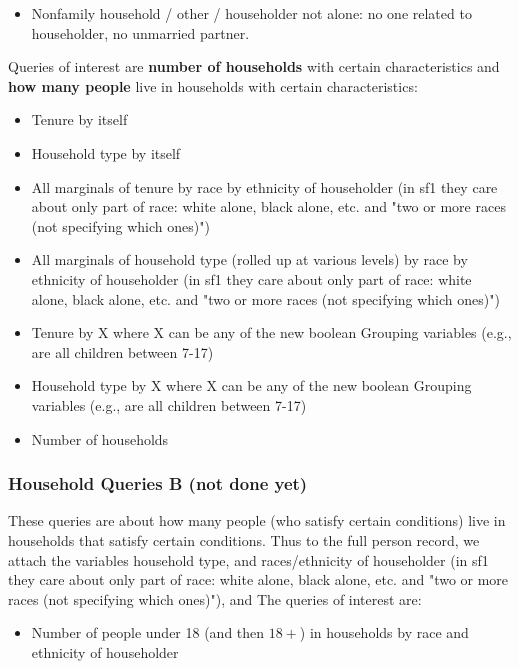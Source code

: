 \documentclass{amsart}
\begin{document}
{\begin{itemize}
\item Nonfamily household / other / householder not alone: no one related to householder, no unmarried partner. 
\end{itemize}
Queries of interest are \textbf{number of households} with certain characteristics and \textbf{how many people} live in households with certain characteristics:
\begin{itemize}
\item Tenure by itself
\item Household type by itself
\item All marginals of tenure by race by ethnicity of householder (in sf1 they care about only part of race: white alone, black alone, etc. and "two or more races (not specifying which ones)")
\item All marginals of household type (rolled up at various levels) by race by ethnicity of householder (in sf1 they care about only part of race: white alone, black alone, etc. and "two or more races (not specifying which ones)")
\item Tenure by X where X can be any of the new boolean Grouping variables (e.g., are all children between 7-17)
\item Household type by X where X can be any of the new boolean Grouping variables (e.g., are all children between 7-17)
\item Number of households
\end{itemize}
\subsubsection{Household Queries B (not done yet)}
These queries are about how many people (who satisfy certain conditions) live in households that satisfy certain conditions. Thus to the full person record, we attach the variables household type, and races/ethnicity of householder (in sf1 they care about only part of race: white alone, black alone, etc. and "two or more races (not specifying which ones)"), and
The queries of interest are:
\begin{itemize}
\item Number of people under 18 (and then $18+$) in households by race and ethnicity of householder
\end{itemize}
}
\end{document}
